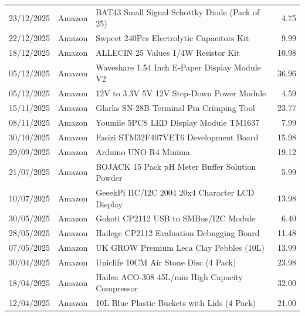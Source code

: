 \begin{table}[h!]
\begin{tabularx}{\textwidth}{@{} ll X r @{}}
		23/12/2025    & Amazon          & BAT43 Small Signal Schottky Diode (Pack of 25)           & 4.75           \\
		22/12/2025    & Amazon          & Swpeet 240Pcs Electrolytic Capacitors Kit                & 9.99           \\
		18/12/2025    & Amazon          & ALLECIN 25 Values 1/4W Resistor Kit                      & 10.98          \\
		05/12/2025    & Amazon          & Waveshare 1.54 Inch E-Paper Display Module V2            & 36.96          \\
		05/12/2025    & Amazon          & 12V to 3.3V 5V 12V Step-Down Power Module                & 4.59           \\
		15/11/2025    & Amazon          & Glarks SN-28B Terminal Pin Crimping Tool                 & 23.77          \\
		08/11/2025    & Amazon          & Youmile 5PCS LED Display Module TM1637                   & 7.99           \\
		30/10/2025    & Amazon          & Fasizi STM32F407VET6 Development Board                   & 15.98          \\
		29/09/2025    & Amazon          & Arduino UNO R4 Minima                                    & 19.12          \\
		21/07/2025    & Amazon          & BOJACK 15 Pack pH Meter Buffer Solution Powder           & 5.99           \\
		10/07/2025    & Amazon          & GeeekPi IIC/I2C 2004 20x4 Character LCD Display          & 13.98          \\
		30/05/2025    & Amazon          & Gokoti CP2112 USB to SMBus/I2C Module                    & 6.40           \\
		28/05/2025    & Amazon          & Hailege CP2112 Evaluation Debugging Board                & 11.48          \\
		07/05/2025    & Amazon          & UK GROW Premium Leca Clay Pebbles (10L)                  & 13.99          \\
		30/04/2025    & Amazon          & Uniclife 10CM Air Stone Disc (4 Pack)                    & 23.98          \\
		18/04/2025    & Amazon          & Hailea ACO-308 45L/min High Capacity Compressor          & 32.00          \\
		12/04/2025    & Amazon          & 10L Blue Plastic Buckets with Lids (4 Pack)              & 21.00          \\

\end{tabularx}
\end{table}
